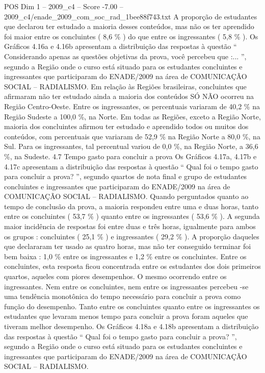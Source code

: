 \begin{textsample}{POS Dim 1 – 2009\_c4 – Score -7.00 – 2009\_c4/enade\_2009\_com\_soc\_rad\_1bee88f743.txt}
A proporção de estudantes que declarou ter estudado a maioria desses conteúdos, mas não os ter aprendido foi maior entre os concluintes ( 8,6 \% ) do que entre os ingressantes ( 5,8 \% ).
Os Gráficos 4.16a e 4.16b apresentam a distribuição das respostas à questão “ Considerando apenas as questões objetivas da prova, você percebeu que :... ”, segundo a Região onde o curso está situado para os estudantes concluintes e ingressantes que participaram do ENADE/2009 na área de COMUNICAÇÃO SOCIAL – RADIALISMO.
Em relação às Regiões brasileiras, concluintes que afirmaram não ter estudado ainda a maioria dos conteúdos SÓ NÃO ocorreu na Região Centro-Oeste.
Entre os ingressantes, os percentuais variaram de 40,2 \% na Região Sudeste a 100,0 \%, na Norte.
Em todas as Regiões, exceto a Região Norte, maioria dos concluintes afirmou ter estudado e aprendido todos ou muitos dos conteúdos, com percentuais que variaram de 52,9 \% na Região Norte a 80,0 \%, na Sul.
Para os ingressantes, tal percentual variou de 0,0 \%, na Região Norte, a 36,6 \%, na Sudeste. 4.7 Tempo gasto para concluir a prova Os Gráficos 4.17a, 4.17b e 4.17c apresentam a distribuição das respostas à questão “ Qual foi o tempo gasto para concluir a prova? ”, segundo quartos de nota final e grupo de estudantes concluintes e ingressantes que participaram do ENADE/2009 na área de COMUNICAÇÃO SOCIAL – RADIALISMO.
Quando perguntados quanto ao tempo de conclusão da prova, a maioria respondeu entre uma e duas horas, tanto entre os concluintes ( 53,7 \% ) quanto entre os ingressantes ( 53,6 \% ).
A segunda maior incidência de respostas foi entre duas e três horas, igualmente para ambos os grupos : concluintes ( 25,1 \% ) e ingressantes ( 29,2 \% ).
A proporção daqueles que declararam ter usado as quatro horas, mas não ter conseguido terminar foi bem baixa : 1,0 \% entre os ingressantes e 1,2 \% entre os concluintes.
Entre os concluintes, esta resposta ficou concentrada entre os estudantes dos dois primeiros quartos, aqueles com piores desempenhos.
O mesmo ocorrendo entre os ingressantes.
Nem entre os concluintes, nem entre os ingressantes percebeu -se uma tendência monotônica do tempo necessário para concluir a prova como função do desempenho.
Tanto entre os concluintes quanto entre os ingressantes os estudantes que levaram menos tempo para concluir a prova foram aqueles que tiveram melhor desempenho.
Os Gráficos 4.18a e 4.18b apresentam a distribuição das respostas à questão “ Qual foi o tempo gasto para concluir a prova? ”, segundo a Região onde o curso está situado para os estudantes concluintes e ingressantes que participaram do ENADE/2009 na área de COMUNICAÇÃO SOCIAL – RADIALISMO.

\end{textsample}
